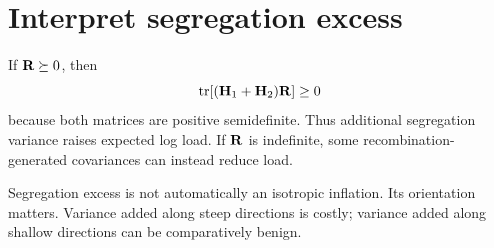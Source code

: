 \section{Interpret segregation excess}

If \(\mathbf{R}\succeq0\), then
\begin{equation}
\operatorname{tr}[(\mathbf{H}_1+\mathbf{H}_2)\mathbf{R}]\ge0
\end{equation}
because both matrices are positive semidefinite. Thus additional segregation variance raises expected log load. If \(\mathbf{R}\) is indefinite, some recombination-generated covariances can instead reduce load.

\inwords Segregation excess is not automatically an isotropic inflation. Its orientation matters. Variance added along steep directions is costly; variance added along shallow directions can be comparatively benign.
